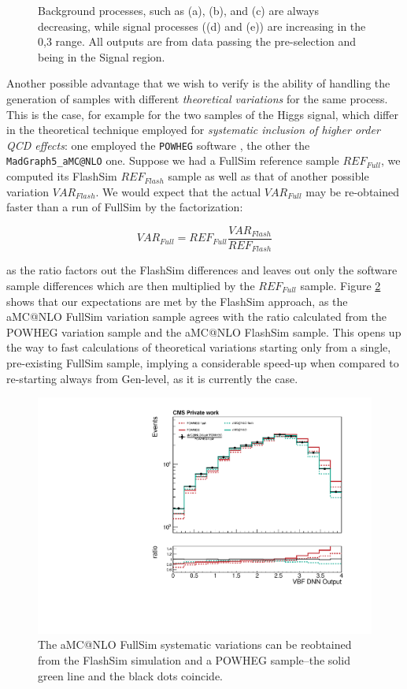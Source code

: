 \begin{figure}
    \caption[Angular distributions]{Background processes, such as (a), (b), and (c) are always decreasing, while signal processes ((d) and (e)) are increasing in the 0,3 range. All outputs are from data passing the pre-selection and being in the Signal region. }\label{fig:DNNout}
\end{figure}

Another possible advantage that we wish to verify is the ability of handling the generation of samples with different \emph{theoretical variations} for the same process. This is the case, for example for the two samples of the Higgs signal, which differ in the theoretical technique employed for \emph{systematic inclusion of higher order QCD effects}: one employed the \texttt{POWHEG} software \cite{Nason_2004}, the other the \texttt{MadGraph5\_aMC@NLO} \cite{powpow} one. Suppose we had a FullSim reference sample $REF_{Full}$, we computed its FlashSim $REF_{Flash}$ sample as well as that of another possible variation $VAR_{Flash}$. We would expect that the actual $VAR_{Full}$ may be re-obtained faster than a run of FullSim by the factorization:

\[VAR_{Full} = REF_{Full} \frac{VAR_{Flash}}{REF_{Flash}}
\]

as the ratio factors out the FlashSim differences and leaves out only the software sample differences which are then multiplied by the $REF_{Full}$ sample. Figure \ref{fig:sysvar} shows that our expectations are met by the FlashSim approach, as the aMC@NLO FullSim variation sample agrees with the ratio calculated from the POWHEG variation sample and the aMC@NLO FlashSim sample. This opens up the way to fast calculations of theoretical variations starting only from a single, pre-existing FullSim sample, implying a considerable speed-up when compared to re-starting always from Gen-level, as it is currently the case.

\begin{figure}
    \centering
    \includegraphics[width=\linewidth]{gfx/ch6/systematic_production.pdf}
    \caption[Systematic production]{The aMC@NLO FullSim systematic variations can be reobtained from the FlashSim simulation and a POWHEG sample--the solid green line and the black dots coincide.}
    \label{fig:sysvar}
\end{figure}

